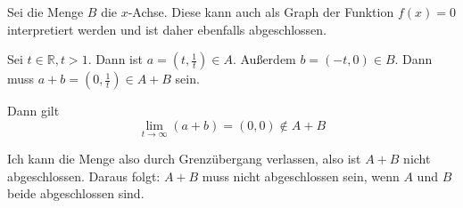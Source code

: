 \documentclass[a4paper,german,12pt,smallheadings]{scrartcl}
\begin{document}
\begin{enumerate}[(1)]
    Sei die Menge $B$ die $x$-Achse. Diese kann auch als Graph der Funktion $f(x) =
    0$ interpretiert werden und ist daher ebenfalls abgeschlossen.

    Sei $t \in \mathbb{R}, t > 1$. Dann ist $a = (t, \frac{1}{t}) \in A$. Außerdem
    $b = (-t, 0) \in B$. Dann muss $a+b = (0, \frac{1}{t}) \in A+B$ sein.

    Dann gilt
    \begin{equation*}
      \lim_{t \to \infty} (a+b) = (0,0) \notin A+B
    \end{equation*}

    Ich kann die Menge also durch Grenzübergang verlassen, also ist $A+B$ nicht
    abgeschlossen. Daraus folgt: $A + B$ muss nicht abgeschlossen sein, wenn $A$
    und $B$ beide abgeschlossen sind.
\end{enumerate}
\end{document}
